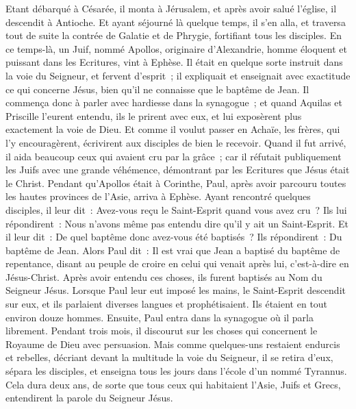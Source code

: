 \begin{multicols}{2}
Etant débarqué à Césarée, il monta à Jérusalem, et après avoir salué l'église, il descendit à Antioche.
Et ayant séjourné là quelque temps, il s'en alla, et traversa tout de suite la contrée de Galatie et de Phrygie, fortifiant tous les disciples.
En ce temps-là, un Juif, nommé Apollos, originaire d'Alexandrie, homme éloquent et puissant dans les Ecritures, vint à Ephèse.
Il était en quelque sorte instruit dans la voie du Seigneur, et fervent d'esprit~; il expliquait et enseignait avec exactitude ce qui concerne Jésus, bien qu'il ne connaisse que le baptême de Jean.
Il commença donc à parler avec hardiesse dans la synagogue~; et quand Aquilas et Priscille l'eurent entendu, ils le prirent avec eux, et lui exposèrent plus exactement la voie de Dieu.
Et comme il voulut passer en Achaïe, les frères, qui l'y encouragèrent, écrivirent aux disciples de bien le recevoir. Quand il fut arrivé, il aida beaucoup ceux qui avaient cru par la grâce~;
car il réfutait publiquement les Juifs avec une grande véhémence, démontrant par les Ecritures que Jésus était le Christ.
\VerseOne{}Pendant qu'Apollos était à Corinthe, Paul, après avoir parcouru toutes les hautes provinces de l'Asie, arriva à Ephèse. Ayant rencontré quelques disciples, il leur dit~:
Avez-vous reçu le Saint-Esprit quand vous avez cru~? Ils lui répondirent~: Nous n'avons même pas entendu dire qu'il y ait un Saint-Esprit.
Et il leur dit~: De quel baptême donc avez-vous été baptisés~? Ils répondirent~: Du baptême de Jean.
Alors Paul dit~: Il est vrai que Jean a baptisé du baptême de repentance, disant au peuple de croire en celui qui venait après lui, c'est-à-dire en Jésus-Christ.
Après avoir entendu ces choses, ils furent baptisés au Nom du Seigneur Jésus.
Lorsque Paul leur eut imposé les mains, le Saint-Esprit descendit sur eux, et ils parlaient diverses langues et prophétisaient.
Ils étaient en tout environ douze hommes.
Ensuite, Paul entra dans la synagogue où il parla librement. Pendant trois mois, il discourut sur les choses qui concernent le Royaume de Dieu avec persuasion.
Mais comme quelques-uns restaient endurcis et rebelles, décriant devant la multitude la voie du Seigneur, il se retira d'eux, sépara les disciples, et enseigna tous les jours dans l'école d'un nommé Tyrannus.
Cela dura deux ans, de sorte que tous ceux qui habitaient l'Asie, Juifs et Grecs, entendirent la parole du Seigneur Jésus.

\end{multicols}
